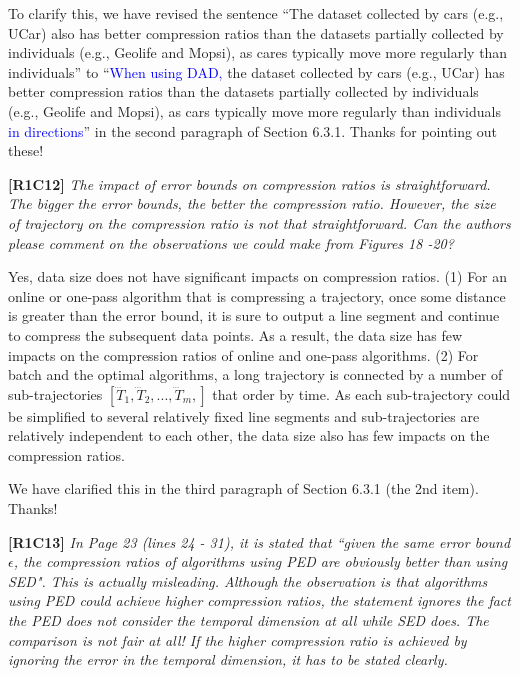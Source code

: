\documentclass{letter}
\begin{document}
To clarify this, we have revised the sentence ``The dataset collected by cars (e.g., UCar) also has better compression ratios than the datasets partially collected by individuals (e.g., Geolife and Mopsi), as cares typically move more regularly than individuals'' to ``\textcolor{blue}{When using DAD,} the dataset collected by cars (e.g., UCar) has better compression ratios than the datasets partially collected by individuals (e.g., Geolife and Mopsi), as cars typically move more regularly than individuals \textcolor{blue}{in directions}'' in the second paragraph of Section 6.3.1.
Thanks for pointing out these!


\textbf{[R1C12]} \emph{The impact of error bounds on compression ratios is straightforward. The bigger the error bounds, the better the compression ratio. However, the size of trajectory on the compression ratio is not that straightforward. Can the authors please comment on the observations we could make from Figures 18 -20? }

Yes, data size does not have significant impacts on compression ratios. (1) For an online or one-pass algorithm that is compressing a trajectory, once some distance is greater than the error bound, it is sure to output a line segment and continue to compress the subsequent data points. As a result, the data size has few impacts on the compression ratios of online and one-pass algorithms.
(2) For batch and the optimal algorithms, a long trajectory is connected by a number of sub-trajectories $[\dddot{T}_1,\dddot{T}_2,..., \dddot{T}_m, ]$ that order by time. As each sub-trajectory could be simplified to several relatively fixed line segments and sub-trajectories are relatively independent to each other, the data size also has few impacts on the compression ratios.



We have clarified this in the third paragraph of Section 6.3.1 (the 2{nd} item). Thanks!



\textbf{[R1C13]} \emph{ In Page 23 (lines 24 - 31), it is stated that ``given the same error bound $\epsilon$, the compression ratios of algorithms using PED are obviously better than using SED". This is actually misleading. Although the observation is that algorithms using PED could achieve higher compression ratios, the statement ignores the fact the PED does not consider the temporal dimension at all while SED does. The comparison is not fair at all! If the higher compression ratio is achieved by ignoring the error in the temporal dimension, it has to be stated clearly.}
\end{document}
